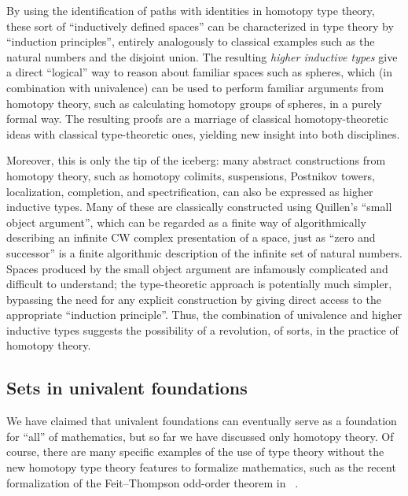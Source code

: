 By using the identification of paths with identities in homotopy type theory, these sort of ``inductively defined spaces'' can be characterized in type theory by ``induction principles'', entirely analogously to classical examples such as the natural numbers and the disjoint union.
The resulting \emph{higher inductive types}
%
give a direct ``logical'' way to reason about familiar spaces such as spheres, which (in combination with univalence) can be used to perform familiar arguments from homotopy theory, such as calculating homotopy groups of spheres, in a purely formal way.
The resulting proofs are a marriage of classical homotopy-theoretic ideas with classical type-theoretic ones, yielding new insight into both disciplines.

Moreover, this is only the tip of the iceberg: many abstract constructions from homotopy theory, such as homotopy colimits, suspensions, Postnikov towers, localization, completion, and spectrification, can also be expressed as higher inductive types.
Many of these are classically constructed using Quillen's ``small object argument'', which can be regarded as a finite way of algorithmically describing an infinite CW complex presentation of a space, just as ``zero and successor'' is a finite algorithmic description of the infinite set of natural numbers.
Spaces produced by the small object argument are infamously complicated and difficult to understand; the type-theoretic approach is potentially much simpler, bypassing the need for any explicit construction by giving direct access to the appropriate ``induction principle''.
Thus, the combination of univalence and higher inductive types suggests the possibility of a revolution, of sorts, in the practice of homotopy theory.


\subsection*{Sets in univalent foundations}

%

We have claimed that univalent foundations can eventually serve as a foundation for ``all'' of mathematics, but so far we have discussed 
only homotopy theory.  Of course, there are many specific examples of the use of type theory without the new homotopy type theory features to formalize mathematics,
%
%
%
%
%
such as the recent formalization of the Feit--Thompson odd-order theorem in \Coq~\cite{gonthier}.

